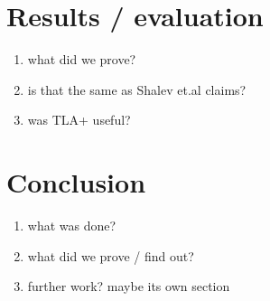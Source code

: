\documentclass[journal]{IEEEtran}
\begin{document}
\section{Results / evaluation}
    \begin{enumerate}
        \item what did we prove?
        \item is that the same as Shalev et.al claims?
        \item was TLA+ useful?
    \end{enumerate}

\section{Conclusion}
    \begin{enumerate}
        \item what was done?
        \item what did we prove / find out?
        \item further work? maybe its own section
    \end{enumerate}


\printbibliography{}

\end{document}
